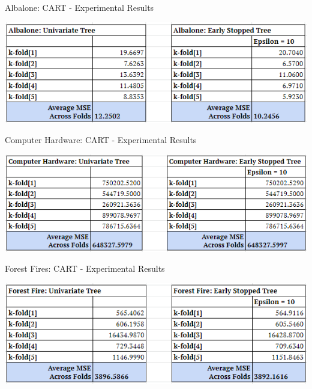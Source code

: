 \documentclass[twoside,11pt]{article}
\begin{document}
\begin{table}[h]
	\centering
	\caption{Albalone: CART - Experimental Results}
	\label{tab:table4}
	\includegraphics[scale=.7]{Albalone_Results}\newline
\end{table}

\begin{table}[h]
	\centering
	\caption{Computer Hardware: CART - Experimental Results}
	\label{tab:tale5}
	\includegraphics[scale=.7]{CompHardware_Results}\newline
\end{table}

\begin{table}[h]
	\centering
	\caption{Forest Fires: CART - Experimental Results}
	\label{tab:table6}
	\includegraphics[scale=.7]{ForestFire_Results}\newline
\end{table}



\newpage
\end{document}

